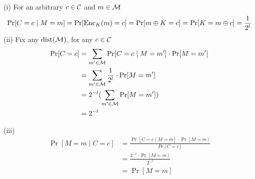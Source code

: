 \begin{myProof}
	(i) For an arbitrary \(c \in \operatorname{\mathcal{C}}\) and \(m \in \operatorname{\mathcal{M}}\) \\
	\[ \Pr[C = c \mid M = m] = \Pr[\operatorname{Enc}_K(m) = c] = \Pr[m \oplus K = c] = \Pr[K = m \oplus c] = \frac{1}{2^l}\]
	(ii) Fix any \(\operatorname{dist}(\operatorname{\mathcal{M}})\), for any \(c \in \operatorname{\mathcal{C}}\)
	\begin{align*}
		\Pr [C = c] &= \sum_{m' \in \operatorname{\mathcal{M}}} \Pr[C = c \mid M = m'] \cdot \Pr[M = m'] \\
		&= \sum_{m' \in \operatorname{\mathcal{M}}} \frac{1}{2^l} \cdot \Pr[M = m'] \\
		&= 2^{-l} (\sum_{m' \in \operatorname{\mathcal{M}}} \Pr[M = m']) \\
		&= 2^{-l}
	\end{align*}
	
	(iii)
	\begin{align*}
		\Pr[M = m \mid C = c] &= \frac{\Pr[C = c \mid M = m] \cdot \Pr[M = m]}{Pr[C = c]} \\
		&= \frac{2^{-l} \cdot \Pr[M = m]}{2^{-l}} \\
		&= \Pr[M = m]
	\end{align*}
\end{myProof}

